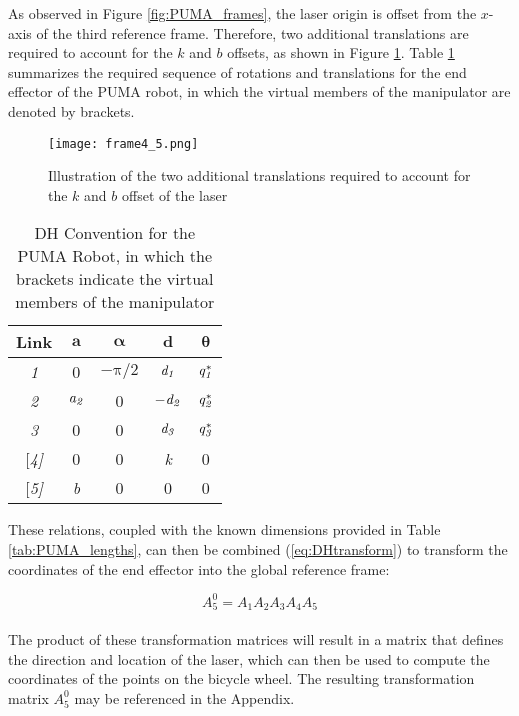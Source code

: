 \documentclass[12pt]{article}
\begin{document}
As observed in Figure \ref{fig:PUMA_frames}, the laser origin is offset from the $x$-axis of the third reference frame.  Therefore, two additional translations are required to account for the $k$ and $b$ offsets, as shown in Figure \ref{fig:frame4_5}. Table \ref{tab:DH_convention} summarizes the required sequence of rotations and translations for the end effector of the PUMA robot, in which the virtual members of the manipulator are denoted by brackets. 


\begin{figure}[!ht]
  {\texttt{[image: frame4\_5.png]}}
  \centering
  \caption{Illustration of the two additional translations required to account for the $k$ and $b$ offset of the laser} 
  \centering
  \label{fig:frame4_5}
\end{figure}
\noindent

\begin{table}[ht!]
\begin{center}
\begin{tabular}{|c|c|c|c|c|}
\hline
\textbf{Link}    & $\boldsymbol{a}$  & $\boldsymbol{\alpha}$ & $\boldsymbol{d}$   & $\boldsymbol{\theta}$  \\ \hline
\it{1}       & 0  & $\mathrm{-\pi/2}$ & $\mathrm{\it{d}_{1}}$  & $\mathrm{\it{q}_{1}^{*}}$ \\ \hline
\it{2}       & $\mathrm{\it{a}_{2}}$ & 0     & $\mathrm{-\it{d}_{2}}$ & $\mathrm{\it{q}_{2}^{*}}$ \\ \hline
\it{3}       & 0  & 0     & $\mathrm{\it{d}_{3}}$  & $\mathrm{\it{q}_{3}^{*}}$ \\ \hline
{[}\it{4}{]} & 0  & 0     & \it{k}   & 0      \\ \hline
{[}\it{5}{]} & \it{b}  & 0     & 0   & 0      \\ \hline
\end{tabular}
\caption{DH Convention for the PUMA Robot, in which the brackets indicate the virtual members of the manipulator}
\label{tab:DH_convention}
\end{center}
\end{table}

These relations, coupled with the known dimensions provided in Table \ref{tab:PUMA_lengths}, can then be combined (\ref{eq:DHtransform}) to transform the coordinates of the end effector into the global reference frame: 

\begin{equation}
	A_5^0 = A_1A_2A_3A_4A_5
	\label{eq:DHtransform}
\end{equation}\\
\noindent
The product of these transformation matrices will result in a matrix that defines the direction and location of the laser, which can then be used to compute the coordinates of the points on the bicycle wheel. The resulting transformation matrix $A_5^0$ may be referenced in the Appendix.  
\end{document}
